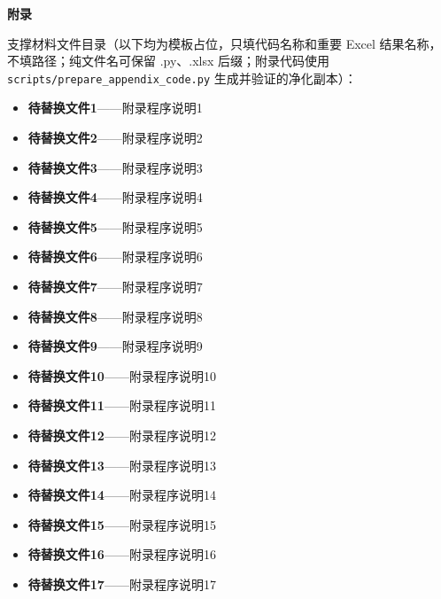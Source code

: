 \documentclass[12pt,a4paper]{article}
\newcommand{\appendixtitlefont}{\fontsize{14pt}{18pt}\selectfont\heiti\bfseries}
\begin{document}
\clearpage
\label{appendix:start}
\begin{appendices}
\begin{center}
{\appendixtitlefont 附录}
\end{center}
\vspace{0.35em}

\par\noindent\hspace{2em}支撑材料文件目录（以下均为模板占位，只填代码名称和重要 Excel 结果名称，不填路径；纯文件名可保留 .py、.xlsx 后缀；附录代码使用 \texttt{scripts/prepare\_appendix\_code.py} 生成并验证的净化副本）：\par

\newcommand{\AppendixCodeName}[1]{待替换文件#1}

\begin{itemize}[label={},leftmargin=1.9em,itemsep=0.25em,topsep=0.25em]
    \item \textbf{\AppendixCodeName{1}}——附录程序说明1
    \item \textbf{\AppendixCodeName{2}}——附录程序说明2
    \item \textbf{\AppendixCodeName{3}}——附录程序说明3
    \item \textbf{\AppendixCodeName{4}}——附录程序说明4
    \item \textbf{\AppendixCodeName{5}}——附录程序说明5
    \item \textbf{\AppendixCodeName{6}}——附录程序说明6
    \item \textbf{\AppendixCodeName{7}}——附录程序说明7
    \item \textbf{\AppendixCodeName{8}}——附录程序说明8
    \item \textbf{\AppendixCodeName{9}}——附录程序说明9
    \item \textbf{\AppendixCodeName{10}}——附录程序说明10
    \item \textbf{\AppendixCodeName{11}}——附录程序说明11
    \item \textbf{\AppendixCodeName{12}}——附录程序说明12
    \item \textbf{\AppendixCodeName{13}}——附录程序说明13
    \item \textbf{\AppendixCodeName{14}}——附录程序说明14
    \item \textbf{\AppendixCodeName{15}}——附录程序说明15
    \item \textbf{\AppendixCodeName{16}}——附录程序说明16
    \item \textbf{\AppendixCodeName{17}}——附录程序说明17
\end{itemize}


\end{appendices}
\end{document}

